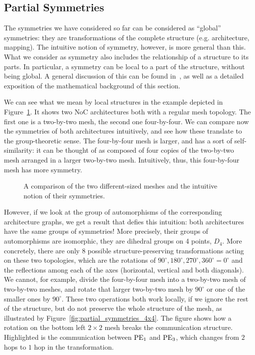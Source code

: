\subsection{Partial Symmetries}
\label{sec:partial_symmetries}

The symmetries we have considered so far can be considered as ``global'' symmetries: they are transformations of the complete structure (e.g. architecture, mapping).
The intuitive notion of symmetry, however, is more general than this.
What we consider as symmetry also includes the relationship of a structure to its parts.
In particular, a symmetry can be local to a part of the structure, without being global. A general discussion of this can be found in~\cite{lawson_inverse_semigroups}, as well as a detailed exposition of the mathematical background of this section.

We can see what we mean by local structures in the example depicted in Figure~\ref{fig:motivation_partial_symmetries}.
It shows two \ac{NoC} architectures both with a regular mesh topology.
The first one is a two-by-two mesh, the second one four-by-four.
We can compare now the symmetries of both architectures intuitively, and see how these translate to the group-theoretic sense.
The four-by-four mesh is larger, and has a sort of self-similarity: it can be thought of as composed of four copies of the two-by-two mesh arranged in a larger two-by-two mesh.
Intuitively, thus, this four-by-four mesh has more symmetry.

\begin{figure}[h]
	\centering
   \resizebox{0.85\textwidth}{!}{
      \begin{tikzpicture}
      
      \end{tikzpicture}
      }
	\caption{A comparison of the two different-sized meshes and the intuitive notion of their symmetries.}
	\label{fig:motivation_partial_symmetries}
\end{figure}

However, if we look at the group of automorphisms of the corresponding architecture graphs, we get a result that defies this intuition:
both architectures have the same groups of symmetries!
More precisely, their groups of automorphisms are isomorphic, they are dihedral groups on 4 points, $D_4$.
More concretely, there are only 8  possible structure-preserving transformations acting on these two topologies, which are the rotations of $90^\circ,180^\circ,270^\circ,360^\circ = 0^\circ$ and the reflections among each of the axes (horizontal, vertical and both diagonals).
We cannot, for example, divide the four-by-four mesh into a two-by-two mesh of two-by-two meshes, and rotate that larger two-by-two mesh by $90^\circ$ or one of the smaller ones by $90^\circ$.
These two operations both work locally, if we ignore the rest of the structure, but do not preserve the whole structure of the mesh, as illustrated by Figure~\ref{fig:partial_symmetries_4x4}.
The figure shows how a rotation on the bottom left $2 \times 2$ mesh breaks the communication structure.
Highlighted is the communication between $\operatorname{PE}_1$ and $\operatorname{PE}_3$, which changes from $2$ hops to $1$ hop in the transformation.

